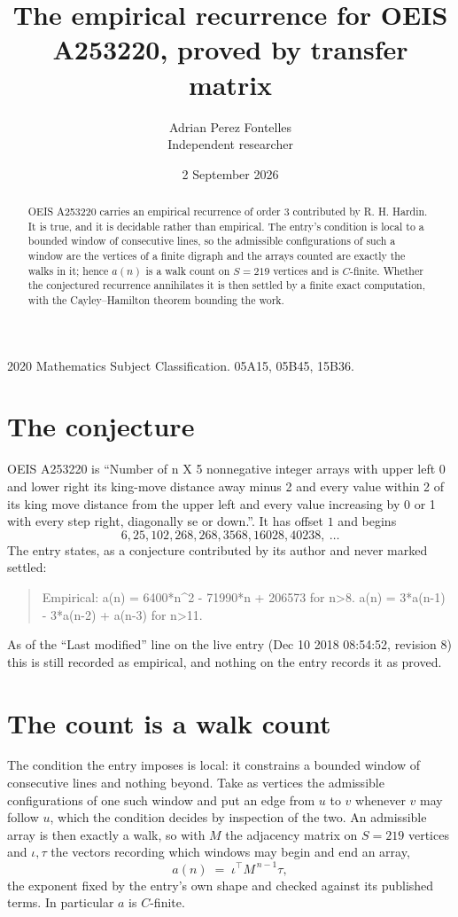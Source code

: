 \documentclass[11pt,a4paper]{article}
\title{The empirical recurrence for OEIS A253220, proved by transfer matrix}
\author{Adrian Perez Fontelles\\ \small Independent researcher}
\date{2 September 2026}
\theoremstyle{plain}
\theoremstyle{definition}
\begin{document}
\maketitle

\begin{abstract}
OEIS A253220 carries an empirical recurrence of order $3$ contributed by R. H. Hardin. It is
true, and it is decidable rather than empirical. The entry's condition is local to a bounded window of consecutive lines, so
the admissible configurations of such a window are the vertices of a finite digraph and the
arrays counted are exactly the walks in it; hence $a(n)$ is a walk count on $S=219$ vertices
and is $C$-finite. Whether the conjectured recurrence annihilates it is then settled by a
finite exact computation, with the Cayley--Hamilton theorem bounding the work.
\end{abstract}

\noindent\small 2020 Mathematics Subject Classification. 05A15, 05B45, 15B36.\normalsize

\section{The conjecture}

OEIS A253220 is ``Number of n X 5 nonnegative integer arrays with upper left 0 and lower right its king-move distance away minus 2 and every value within 2 of its king move distance from the upper left and every value increasing by 0 or 1 with every step right, diagonally se or down.''. It has offset $1$ and begins
\[
6, 25, 102, 268, 268, 3568, 16028, 40238,\ \dots
\]
The entry states, as a conjecture contributed by its author and never marked settled:
\begin{quote}
Empirical: a(n) = 6400*n\^{}2 - 71990*n + 206573 for n>8. a(n) = 3*a(n-1) - 3*a(n-2) + a(n-3) for n>11.
\end{quote}
As of the ``Last modified'' line on the live entry (Dec 10 2018 08:54:52, revision 8) this is still
recorded as empirical, and nothing on the entry records it as proved.

\section{The count is a walk count}

The condition the entry imposes is local: it constrains a bounded window of consecutive lines and nothing beyond. Take as
vertices the admissible configurations of one such window and put an edge from $u$ to $v$
whenever $v$ may follow $u$, which the condition decides by inspection of the two. An
admissible array is then exactly a walk, so with $M$ the adjacency matrix on $S=219$ vertices
and $\iota,\tau$ the vectors recording which windows may begin and end an array,
\[
a(n)\;=\;\iota^{\!\top}M^{\,n-1}\tau ,
\]
the exponent fixed by the entry's own shape and checked against its published terms. In
particular $a$ is $C$-finite.
\end{document}
